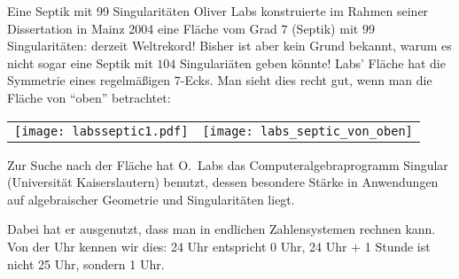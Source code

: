 \begin{surferPage}{Eine Septik mit 99 Singularitäten}
   Oliver Labs konstruierte im Rahmen seiner Dissertation in Mainz 2004 eine
    Fläche vom Grad $7$ (Septik) mit $99$ Singularitäten: derzeit Weltrekord! 
    Bisher ist aber kein Grund bekannt, warum es nicht sogar eine Septik mit
    $104$ Singulariäten geben könnte!  
    Labs' Fläche hat die Symmetrie eines regelmäßigen $7$-Ecks.
    Man sieht dies recht gut, wenn man die Fläche von ``oben'' betrachtet:
    \vspace*{-0.3em}
    \begin{center}
      \begin{tabular}{c@{\qquad}c}
        \texttt{[image: labsseptic1.pdf]}
        &
        \texttt{[image: labs\_septic\_von\_oben]}
      \end{tabular}
    \end{center}
    \vspace*{-0.3em}
    Zur Suche nach der Fläche hat O.\ Labs das Computeralgebraprogramm
    {\sc Singular} (Universit\"at Kaiserslautern) benutzt, dessen besondere Stärke in
    Anwendungen auf 
    algebraischer Geometrie und Singularitäten liegt.

    Dabei hat er ausgenutzt, dass man in endlichen
    Zahlensystemen rechnen kann. Von der Uhr kennen wir dies: 24 Uhr
    entspricht 0 Uhr, 24 Uhr $+$ 1 Stunde ist nicht 25 Uhr, sondern 1
    Uhr.
\end{surferPage}
